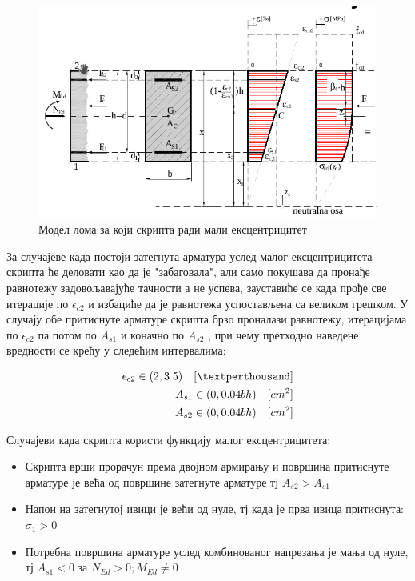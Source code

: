 \documentclass[11pt, a4paper]{article}
\begin{document}
\begin{enumerate}
\begin{itemize}
	\begin{figure}[h]
		\includegraphics[width = 120mm, scale = 1, center]{MaliEks.png}
		\caption{ Модел лома за који скрипта ради мали ексцентрицитет}
	\end{figure}
За случајеве када постоји затегнута арматура услед малог ексцентрицитета скрипта ће деловати као да је "забаговала", али само покушава да пронађе равнотежу задовољавајуће тачности а не успева, зауставиће се када прође све итерације по $\epsilon_{c2} $ и избациће да је равнотежа успостављена са великом грешком. У случају обе притиснуте арматуре скрипта брзо проналази равнотежу, итерацијама по $\epsilon_{c2}$ па потом по $A_{s1}$ и коначно по $A_{s2}$ , при чему претходно наведене вредности се крећу у следећим интервалима:

\begin{align*}
	\epsilon_{c2} \in (2, 3.5)  \quad [\textperthousand]\\
	 A_{s1} \in (0, 0.04bh)  \quad [cm^2]\\
	 A_{s2} \in (0, 0.04bh)  \quad [cm^2]\\
\end{align*}

 Случајеви када скрипта користи функцију малог ексцентрицитета:
 		\begin{itemize}
 			\item Скрипта врши прорачун према двојном армирању и површина притиснуте арматуре је већа од површине затегнуте арматуре тј $A_{s2} > A_{s1}$
 			
 			\item  Напон на затегнутој ивици је већи од нуле, тј када је прва ивица притиснута: $\sigma_1 >  0$
 			
 			\item Потребна површина арматуре услед комбинованог напрезања је мања од нуле, тј $A_{s1} < 0$ за $N_{Ed} > 0; M_{Ed} \neq 0$
 			

\end{itemize}
\end{itemize}
\end{enumerate}
\end{document}
